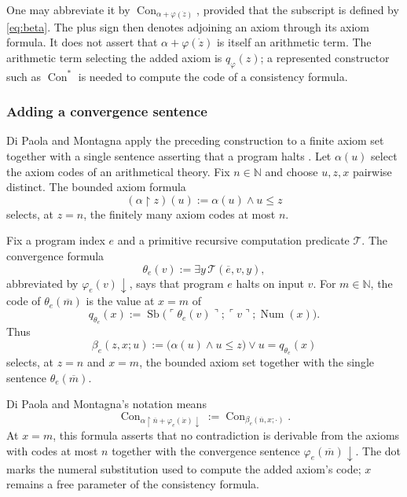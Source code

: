 \documentclass[11pt]{article}
\newcommand{\N}{\mathbb N}
\newcommand{\Num}{\operatorname{Num}}
\newcommand{\Sb}{\operatorname{Sb}}
\newcommand{\Con}{\operatorname{Con}}
\newcommand{\quo}[1]{\ulcorner #1\urcorner}
\newcommand{\bn}[1]{\overline{#1}}
\newcommand{\defeq}{\mathrel{:=}}
\theoremstyle{definition}
\begin{document}
One may abbreviate it by $\Con_{\alpha+\varphi(\dot z)}$, provided
that the subscript is defined by \eqref{eq:beta}. The plus sign then
denotes adjoining an axiom through its axiom formula. It does not
assert that $\alpha+\varphi(\dot z)$ is itself an arithmetic term.
The arithmetic term selecting the added axiom is $q_\varphi(z)$;
a represented constructor such as $\Con^{*}$ is needed to compute
the code of a consistency formula.

\subsubsection*{Adding a convergence sentence}
Di Paola and Montagna apply the preceding construction to a finite
axiom set together with a single sentence asserting that a program
halts \cite[pp.~645--646]{DPM91}. Let $\alpha(u)$ select the axiom
codes of an arithmetical theory. Fix $n\in\N$ and choose $u,z,x$
pairwise distinct.
The bounded axiom formula
\begin{equation}\label{eq:restriction}
 (\alpha\upharpoonright z)(u)\defeq\alpha(u)\land u\leq z
\end{equation}
selects, at $z=n$, the finitely many axiom codes at most $n$.

Fix a program index $e$ and a primitive recursive computation
predicate $\mathcal T$. The convergence formula
\begin{equation}\label{eq:theta}
 \theta_e(v)\defeq\exists y\,\mathcal T(\bn e,v,y),
\end{equation}
abbreviated by $\varphi_e(v)\downarrow$, says that program $e$
halts on input $v$. For $m\in\N$, the code of $\theta_e(\bn m)$
is the value at $x=m$ of
\begin{equation}\label{eq:qtheta}
 q_{\theta_e}(x)\defeq
 \Sb\bigl(\quo{\theta_e(v)};\quo v;\Num(x)\bigr).
\end{equation}
Thus
\begin{equation}\label{eq:beta-e}
 \beta_e(z,x;u)\defeq
 \bigl(\alpha(u)\land u\leq z\bigr)\lor u=q_{\theta_e}(x)
\end{equation}
selects, at $z=n$ and $x=m$, the bounded axiom set together with
the single sentence $\theta_e(\bn m)$.

Di Paola and Montagna's notation \cite[p.~646]{DPM91} means
\begin{equation}\label{eq:dpm}
 \Con_{\alpha\upharpoonright\bn n+\varphi_e(\dot x)\downarrow}
   \defeq\Con_{\beta_e(\bn n,x;\cdot)}.
\end{equation}
At $x=m$, this formula asserts that no contradiction is derivable
from the axioms with codes at most $n$ together with the convergence
sentence $\varphi_e(\bn m)\downarrow$. The dot marks the numeral
substitution used to compute the added axiom's code; $x$ remains
a free parameter of the consistency formula.
\end{document}
